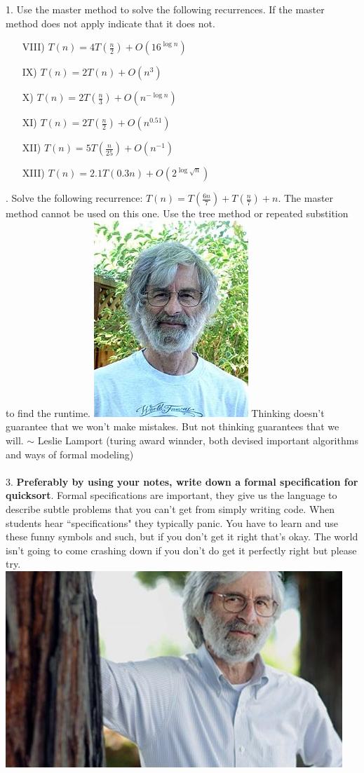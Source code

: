 \documentclass[12pt]{article}
\begin{document}
1. Use the master method to solve the following recurrences. If the master method does not apply indicate that it does not.
\begin{enumerate}
    \item[VIII)]$T(n) = 4T(\frac{n}{2}) + O(16^{\log{n}})$
    \item[IX)]$T(n) = 2T(n) + O(n^3)$
    \item[X)]$T(n) = 2T(\frac{n}{3}) + O(n^{-\log{n}})$
    \item[XI)]$T(n) = 2T(\frac{n}{2}) + O(n^{0.51})$
    \item[XII)]$T(n) = 5T(\frac{n}{25}) + O(n^{-1})$
    \item[XIII)]$T(n) = 2.1T(0.3n) + O(2^{\log{\sqrt{n}}})$
\end{enumerate}
. Solve the following recurrence: $T(n) = T(\frac{6n}{7}) + T(\frac{n}{7})  + n$. The master method cannot be used on this one. Use the tree method or repeated substition to find the runtime.
\newpage
\noindent \includegraphics[scale = 0.5]{lamport.jpg}
Thinking doesn't guarantee that we won't make mistakes. But not thinking guarantees that we will. $\sim$ Leslie Lamport (turing award winnder, both devised important algorithms and ways of formal modeling)\\\\
3. \textbf{Preferably by using your notes, write down a formal specification for quicksort}. Formal specifications are important, they give us the language to describe subtle problems that you can't get from simply writing code. When students hear ``specifications" they typically panic. You have to learn and use these funny symbols and such, but if you don't get it right that's okay. The world isn't going to come crashing down if you don't do get it perfectly right but please try.  
\newpage
\noindent \includegraphics[scale = 0.5]{lamport2.jpg}
\end{document}
